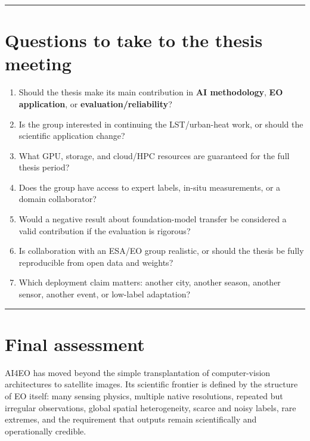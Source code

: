 \documentclass[
  a4paper,
  11pt]{article}
\providecommand{\tightlist}{%
  \setlength{\itemsep}{0pt}\setlength{\parskip}{0pt}}
\begin{document}
\begin{center}\rule{0.5\linewidth}{0.5pt}\end{center}

\hypertarget{questions-to-take-to-the-thesis-meeting}{%
\section{Questions to take to the thesis
meeting}\label{questions-to-take-to-the-thesis-meeting}}

\begin{enumerate}
\def\labelenumi{\arabic{enumi}.}
\tightlist
\item
  Should the thesis make its main contribution in \textbf{AI
  methodology}, \textbf{EO application}, or
  \textbf{evaluation/reliability}?
\item
  Is the group interested in continuing the LST/urban-heat work, or
  should the scientific application change?
\item
  What GPU, storage, and cloud/HPC resources are guaranteed for the full
  thesis period?
\item
  Does the group have access to expert labels, in-situ measurements, or
  a domain collaborator?
\item
  Would a negative result about foundation-model transfer be considered
  a valid contribution if the evaluation is rigorous?
\item
  Is collaboration with an ESA/EO group realistic, or should the thesis
  be fully reproducible from open data and weights?
\item
  Which deployment claim matters: another city, another season, another
  sensor, another event, or low-label adaptation?
\end{enumerate}

\begin{center}\rule{0.5\linewidth}{0.5pt}\end{center}

\hypertarget{final-assessment}{%
\section{Final assessment}\label{final-assessment}}

AI4EO has moved beyond the simple transplantation of computer-vision
architectures to satellite images. Its scientific frontier is defined by
the structure of EO itself: many sensing physics, multiple native
resolutions, repeated but irregular observations, global spatial
heterogeneity, scarce and noisy labels, rare extremes, and the
requirement that outputs remain scientifically and operationally
credible.
\end{document}
